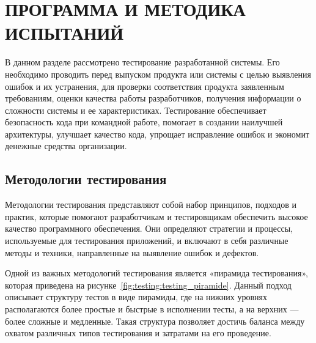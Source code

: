 \section{ПРОГРАММА И МЕТОДИКА ИСПЫТАНИЙ}
\label{sec:testing}


В данном разделе рассмотрено тестирование разработанной системы.
Его необходимо проводить перед выпуском продукта или системы с целью выявления ошибок и их устранения, для проверки соответствия продукта
заявленным требованиям, оценки качества работы разработчиков, получения информации о сложности системы и ее характеристиках.
Тестирование обеспечивает безопасность кода при командной работе, помогает в создании наилучшей
архитектуры, улучшает качество кода, упрощает исправление ошибок и экономит денежные средства организации.

\subsection{Методологии тестирования}
Методологии тестирования представляют собой набор принципов, подходов и практик,
которые помогают разработчикам и тестировщикам обеспечить высокое качество программного обеспечения.
Они определяют стратегии и процессы, используемые для тестирования приложений,
и включают в себя различные методы и техники, направленные на выявление ошибок и дефектов.

Одной из важных методологий тестирования является «пирамида тестирования», которая приведена на рисунке~\ref{fig:testing:testing_piramide}.
Данный подход описывает структуру тестов в виде пирамиды, где на нижних уровнях располагаются более
простые и быстрые в исполнении тесты, а на верхних — более сложные и медленные.
Такая структура позволяет достичь баланса между охватом различных типов тестирования и затратами на его проведение.

